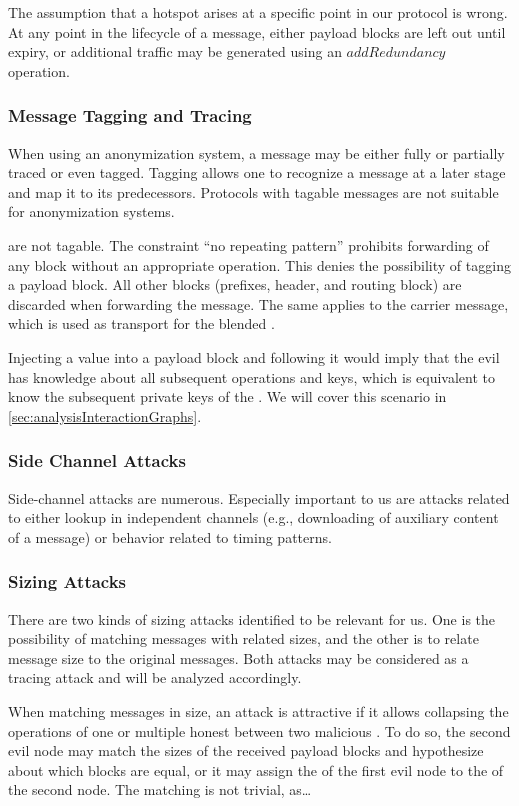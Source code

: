 The assumption that a hotspot arises at a specific point in our protocol is wrong. At any point in the lifecycle of a message, either payload blocks are left out until expiry, or additional traffic may be generated using an $addRedundancy$ operation.

\subsubsection{Message Tagging and Tracing}
When using an anonymization system, a message may be either fully or partially traced or even tagged. Tagging allows one to recognize a message at a later stage and map it to its predecessors. Protocols with tagable messages are not suitable for anonymization systems.

\VortexMessages{} are not tagable. The constraint ``no repeating pattern'' prohibits forwarding of any block without an appropriate operation. This denies the possibility of tagging a payload block. All other blocks (prefixes, header, and routing block) are discarded when forwarding the message. The same applies to the carrier message, which is used as transport for the blended \VortexMessage.

Injecting a value into a payload block and following it would imply that the evil \VortexNode{} has knowledge about all subsequent operations and keys, which is equivalent to know the subsequent private keys of the \VortexNodes. We will cover this scenario in \cref{sec:analysisInteractionGraphs}.

\subsubsection{Side Channel Attacks}
Side-channel attacks are numerous. Especially important to us are attacks related to either lookup in independent channels (e.g., downloading of auxiliary content of a message) or behavior related to timing patterns.

\subsubsection{Sizing Attacks}
There are two kinds of sizing attacks identified to be relevant for us. One is the possibility of matching messages with related sizes, and the other is to relate message size to the original messages. Both attacks may be considered as a tracing attack and will be analyzed accordingly. 

When matching messages in size, an attack is attractive if it allows collapsing the operations of one or multiple honest \VortexNodes{} between two malicious \VortexNodes. To do so, the second evil node may match the sizes of the received payload blocks and hypothesize about which blocks are equal, or it may assign the  of the first evil node to the  of the second node. The matching is not trivial, as\ldots

